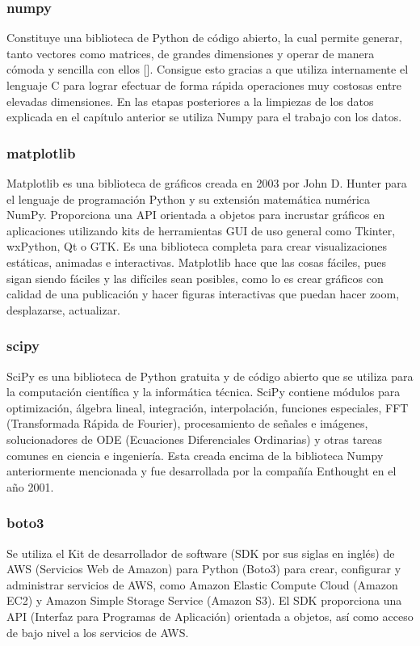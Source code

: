 \subsubsection{numpy}
Constituye una biblioteca de Python de código abierto, la cual permite generar, tanto vectores como matrices, de grandes dimensiones y operar de manera cómoda y sencilla con ellos [\cite{numpy_2012}].
Consigue esto gracias a que utiliza internamente el lenguaje C para lograr efectuar de forma rápida operaciones muy costosas entre elevadas dimensiones.
En las etapas posteriores a la limpiezas de los datos explicada en el capítulo anterior se utiliza Numpy para el trabajo con los datos.

\subsubsection{matplotlib}
Matplotlib es una biblioteca de gráficos creada en 2003 por John D. Hunter para el lenguaje de programación Python y su extensión matemática numérica NumPy. Proporciona una API orientada a objetos para incrustar gráficos en aplicaciones utilizando kits de herramientas GUI de uso general como Tkinter, wxPython, Qt o GTK.
Es una biblioteca completa para crear visualizaciones estáticas, animadas e interactivas. Matplotlib hace que las cosas fáciles, pues sigan siendo fáciles y las difíciles sean posibles, como lo es crear gráficos con calidad de una publicación y hacer figuras interactivas que puedan hacer zoom, desplazarse, actualizar.

\subsubsection{scipy}
SciPy es una biblioteca de Python gratuita y de código abierto que se utiliza para la computación científica y la informática técnica. SciPy contiene módulos para optimización, álgebra lineal, integración, interpolación, funciones especiales, FFT (Transformada Rápida de Fourier), procesamiento de señales e imágenes, solucionadores de ODE (Ecuaciones Diferenciales Ordinarias) y otras tareas comunes en ciencia e ingeniería. Esta creada encima de la biblioteca Numpy anteriormente mencionada y fue desarrollada por la compañía Enthought en el año 2001.


\subsubsection{boto3}
Se utiliza el Kit de desarrollador de software (SDK por sus siglas en inglés) de AWS (Servicios Web de Amazon) para Python (Boto3) para crear, configurar y administrar servicios de AWS, como Amazon Elastic Compute Cloud (Amazon EC2) y Amazon Simple Storage Service (Amazon S3). El SDK proporciona una API (Interfaz para Programas de Aplicación) orientada a objetos, así como acceso de bajo nivel a los servicios de AWS.

